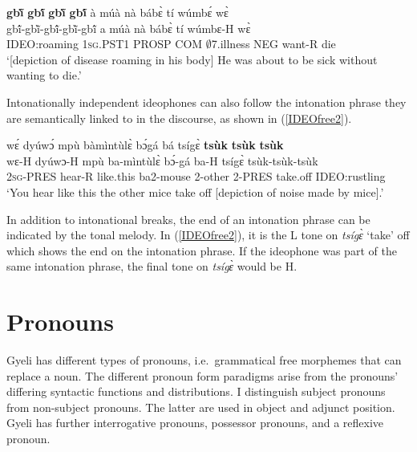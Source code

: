 \begin{exe} 
\ex\label{IDEOfree1} 
   {\bfseries gbĩ̀} {\bfseries gbĩ́} {\bfseries gbĩ̀} {\bfseries gbĩ́}   à múà nà bábɛ̀ tí wúmbɛ́ wɛ̀ \\
            gbĩ́-gbĩ̀-gbĩ́-gbĩ̀-gbĩ́  a múà nà bábɛ̀ tí wúmbɛ-H wɛ̀   \\
         IDEO:roaming 1\textsc{sg}.PST1 PROSP COM $\emptyset$7.illness NEG want-R die \\
    \trans `[depiction of disease roaming in his body] He was about to be sick without wanting to die.'
\end{exe}

\noindent Intonationally independent ideophones can also follow the intonation phrase they are semantically linked to in the discourse, as shown in (\ref{IDEOfree2}). 

\begin{exe} 
\ex\label{IDEOfree2}
  \glll wɛ́ dyúwɔ́ mpù bàmìntùlɛ̀ bɔ́gá bá tsígɛ̀ {\bfseries tsùk} {\bfseries tsùk} {\bfseries tsùk} \\
        wɛ-H dyúwɔ-H mpù ba-mìntùlɛ̀ bɔ́-gá ba-H tsígɛ̀ tsùk-tsùk-tsùk \\
        2\textsc{sg}-PRES hear-R like.this ba2-mouse 2-other 2-PRES take.off IDEO:rustling \\
    \trans `You hear like this the other mice take off [depiction of noise made by mice].'
\end{exe}

\noindent In addition to intonational breaks, the end of an intonation phrase can be indicated by the tonal melody. In (\ref{IDEOfree2}), it is the L tone on {\itshape tsígɛ̀} `take' off which shows the end on the intonation phrase. If the ideophone was part of the same intonation phrase, the final tone on {\itshape tsígɛ̀} would be H.











\section{Pronouns}
\label{sec:PRO}

Gyeli has different types of pronouns, i.e.\ grammatical free morphemes that can replace a noun. The different pronoun form paradigms arise from the pronouns' differing syntactic functions and distributions. I distinguish subject pronouns from non-subject pronouns. The latter are used in object and adjunct position. Gyeli has further interrogative pronouns, possessor pronouns, and a reflexive pronoun. 

